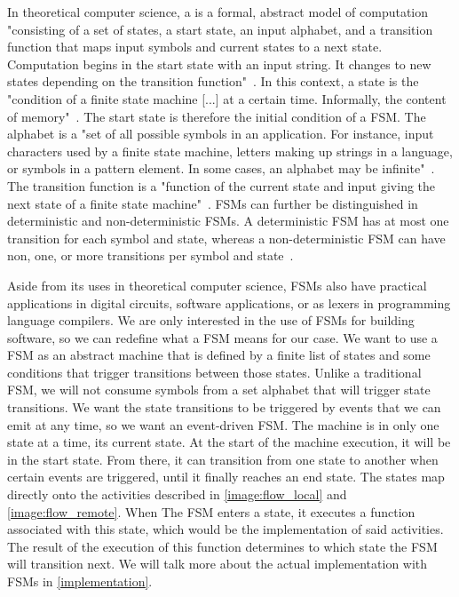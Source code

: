 In theoretical computer science, a  is a formal, abstract model of computation "consisting of a set of states, a start state, an input alphabet, and a transition function that maps input symbols and current states to a next state. Computation begins in the start state with an input string. It changes to new states depending on the transition function"~\autocite{fsm}.
In this context, a state is the "condition of a finite state machine [...] at a certain time. Informally, the content of memory"~\autocite{state}.
The start state is therefore the initial condition of a FSM.
The alphabet is a "set of all possible symbols in an application. For instance, input characters used by a finite state machine, letters making up strings in a language, or symbols in a pattern element. In some cases, an alphabet may be infinite"~\autocite{alphabet}.
The transition function is a "function of the current state and input giving the next state of a finite state machine"~\autocite{transitionfn}.
FSMs can further be distinguished in deterministic and non-deterministic FSMs.
A deterministic FSM has at most one transition for each symbol and state, whereas a non-deterministic FSM can have non, one, or more transitions per symbol and state~\autocite{deterministic}.

Aside from its uses in theoretical computer science, FSMs also have practical applications in digital circuits, software applications, or as lexers in programming language compilers.
We are only interested in the use of FSMs for building software, so we can redefine what a FSM means for our case.
We want to use a FSM as an abstract machine that is defined by a finite list of states and some conditions that trigger transitions between those states.
Unlike a traditional FSM, we will not consume symbols from a set alphabet that will trigger state transitions.
We want the state transitions to be triggered by events that we can emit at any time, so we want an event-driven FSM.
The machine is in only one state at a time, its current state.
At the start of the machine execution, it will be in the start state.
From there, it can transition from one state to another when certain events are triggered, until it finally reaches an end state.
The states map directly onto the activities described in \autoref{image:flow_local} and \autoref{image:flow_remote}.
When The FSM enters a state, it executes a function associated with this state, which would be the implementation of said activities.
The result of the execution of this function determines to which state the FSM will transition next.
We will talk more about the actual implementation with FSMs in \autoref{implementation}.
